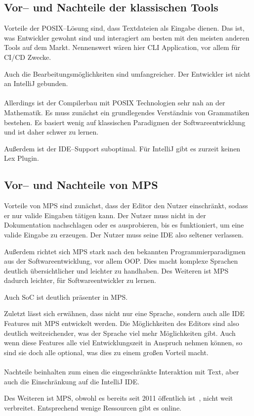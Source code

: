 \subsection{Vor-- und Nachteile der klassischen Tools}\label{subsec:vor---und-nachteile-der-klassischen-tools}
Vorteile der \ac{POSIX}--Lösung sind, dass Textdateien als Eingabe dienen.
Das ist, was Entwickler gewohnt sind und interagiert am besten mit den meisten anderen Tools auf dem Markt.
Nennenswert wären hier \ac{CLI} Application, vor allem für \acs{CI}/\acs{CD} Zwecke.

Auch die Bearbeitungsmöglichkeiten sind umfangreicher.
Der Entwickler ist nicht an IntelliJ gebunden.

\paragraph*{}
Allerdings ist der Compilerbau mit \ac{POSIX} Technologien sehr nah an der Mathematik.
Es muss zunächst ein grundlegendes Verständnis von Grammatiken bestehen.
Es basiert wenig auf klassischen Paradigmen der Softwareentwicklung und ist daher schwer zu lernen.

Außerdem ist der \ac{IDE}--Support suboptimal.
Für IntelliJ gibt es zurzeit keinen Lex Plugin.

\subsection{Vor-- und Nachteile von \acs{MPS}}\label{subsec:vor---und-nachteile-von-mps}
Vorteile von \ac{MPS} sind zunächst, dass der Editor den Nutzer einschränkt, sodass er nur valide Eingaben tätigen kann.
Der Nutzer muss nicht in der Dokumentation nachschlagen oder es ausprobieren, bis es funktioniert, um eine valide Eingabe zu erzeugen.
Der Nutzer muss seine \ac{IDE} also seltener verlassen.

Außerdem richtet sich \ac{MPS} stark nach den bekannten Programmierparadigmen aus der Softwareentwicklung, vor allem \ac{OOP}.
Dies macht komplexe Sprachen deutlich übersichtlicher und leichter zu handhaben.
Des Weiteren ist \ac{MPS} dadurch leichter, für Softwareentwickler zu lernen.

Auch \ac{SoC} ist deutlich präsenter in \ac{MPS}.

Zuletzt lässt sich erwähnen, dass nicht nur eine Sprache, sondern auch alle \ac{IDE} Features mit \ac{MPS} entwickelt werden.
Die Möglichkeiten des Editors sind also deutlich weitreichender, was der Sprache viel mehr Möglichkeiten gibt.
Auch wenn diese Features alle viel Entwicklungszeit in Anspruch nehmen können, so sind sie doch alle optional, was dies zu einem großen Vorteil macht.

\paragraph*{}
Nachteile beinhalten zum einen die eingeschränkte Interaktion mit Text, aber auch die Einschränkung auf die IntelliJ \ac{IDE}.

Des Weiteren ist \ac{MPS}, obwohl es bereits seit 2011 öffentlich ist~\autocite{wikipedia-contributors-2024I}, nicht weit verbreitet.
Entsprechend wenige Ressourcen gibt es online.
